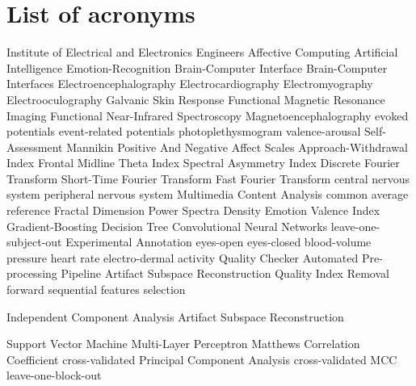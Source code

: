 \chapter{List of acronyms}

\begin{acronym}[TDMAAA]
					{Institute of Electrical and Electronics Engineers}
					{Affective Computing}	
					{Artificial Intelligence}
    			   {Emotion-Recognition}
    			   {Brain-Computer Interface}
    			   {Brain-Computer Interfaces}
    			   {Electroencephalography}
    				{Electrocardiography}
    		{Electromyography}
    	 	{Electrooculography}
    		{Galvanic Skin Response}
               {Functional Magnetic Resonance Imaging}
              {Functional Near-Infrared Spectroscopy}
               {Magnetoencephalography}
               {evoked potentials}
    		  {event-related potentials}
            {photoplethysmogram}
            {valence-arousal}
    		{Self-Assessment Mannikin}
    		{Positive And Negative Affect Scales}
    		{Approach-Withdrawal Index}
    		{Frontal Midline Theta Index}
    		{Spectral Asymmetry Index}
    		{Discrete Fourier Transform}
       {Short-Time Fourier Transform}
    		{Fast Fourier Transform}
    		{central nervous system}
    		{peripheral nervous system}
    		{Multimedia Content Analysis}	
    		{common average reference}
    		{Fractal Dimension}
    		{Power Spectra Density}
    		{Emotion Valence Index}
    		{Gradient-Boosting Decision Tree}
    		{Convolutional Neural Networks}
    		{leave-one-subject-out}
    		{Experimental Annotation}
    		{eyes-open}
    		{eyes-closed}
    		{blood-volume pressure}
    		{heart rate}
    		{electro-dermal activity}
    		{Quality Checker}
    		{Automated Pre-processing Pipeline}
    		{Artifact Subspace Reconstruction}
    		{Quality Index Removal}
    		{forward sequential features selection}
    
    
    
    		{Independent Component Analysis}
    		{Artifact Subspace Reconstruction}
    
    		{Support Vector Machine}
    		{Multi-Layer Perceptron}
    		{Matthews Correlation Coefficient}
			{cross-validated}
    		{Principal Component Analysis}
    		{cross-validated MCC}
    		{leave-one-block-out}
\end{acronym}

